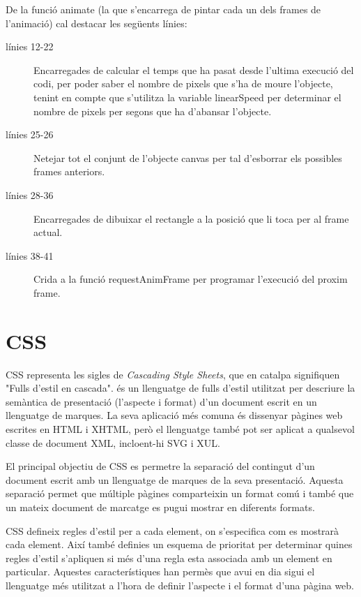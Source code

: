 De la funció animate (la que s'encarrega de pintar cada un dels frames de l'animació) cal destacar les següents línies:

\begin{description}
    \item[línies 12-22] {Encarregades de calcular el temps que ha pasat desde l'ultima execució del codi, per poder saber el nombre de pixels que s'ha de moure l'objecte, tenint en compte que s'utilitza la variable linearSpeed per determinar el nombre de pixels per segons que ha d'abansar l'objecte.}
    \item[línies 25-26] {Netejar tot el conjunt de l'objecte canvas per tal d'esborrar els possibles frames anteriors.}
    \item[línies 28-36] {Encarregades de dibuixar el rectangle a la posició que li toca per al frame actual.}
    \item[línies 38-41] {Crida a la funció requestAnimFrame per programar l'execució del proxim frame.}
\end{description} 


\section{CSS}

CSS representa les sigles de \emph{Cascading Style Sheets}, que en catalpa signifiquen "Fulls d'estil en cascada". és un llenguatge de fulls d'estil utilitzat per descriure la semàntica de presentació (l'aspecte i format) d'un document escrit en un llenguatge de marques. La seva aplicació més comuna és dissenyar pàgines web escrites en HTML i XHTML, però el llenguatge també pot ser aplicat a qualsevol classe de document XML, incloent-hi SVG i XUL.

El principal objectiu de CSS es permetre la separació del contingut d'un document escrit amb un llenguatge de marques de la seva presentació. Aquesta separació permet que múltiple pàgines comparteixin un format comú i també que un mateix document de marcatge es pugui mostrar en diferents formats. 

CSS defineix regles d'estil per a cada element, on s'especifica com es mostrarà cada element. Així també definies un esquema de prioritat per determinar quines regles d'estil s'apliquen si més d'una regla esta associada amb un element en particular. Aquestes característiques han permès que avui en dia sigui el llenguatge més utilitzat a l'hora de definir l'aspecte i el format d'una pàgina web. 

